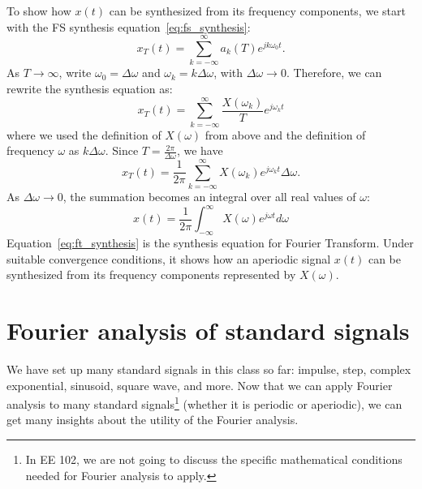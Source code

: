 To show how $x(t)$ can be synthesized from its frequency components, we start with the FS synthesis equation~\eqref{eq:fs_synthesis}:
\[ 
  x_T(t) = \sum_{k=-\infty}^{\infty} a_k(T)e^{jk\omega_0 t}.
\]
As $T \to \infty$, write $\omega_0=\Delta\omega$ and $\omega_k=k\Delta\omega$, with $\Delta\omega\to0$. Therefore, we can rewrite the synthesis equation as:
\begin{equation*}
  x_T(t) = \sum_{k=-\infty}^{\infty} \frac{X(\omega_k)}{T} e^{j\omega_k t}
\end{equation*}
where we used the definition of $X(\omega)$ from above and the definition of frequency $\omega$ as $k \Delta \omega$. Since $T = \frac{2\pi}{\Delta \omega}$, we have
\[
  x_T(t) = \frac{1}{2\pi}\sum_{k=-\infty}^{\infty}  X(\omega_k) e^{j\omega_k t} \Delta \omega.
\]
As $\Delta \omega \to 0$, the summation becomes an integral over all real values of $\omega$:
\begin{equation}
  \label{eq:ft_synthesis}
  x(t) = \frac{1}{2\pi} \int_{-\infty}^{\infty} X(\omega) e^{j\omega t} d\omega
\end{equation}
Equation~\eqref{eq:ft_synthesis} is the synthesis equation for Fourier Transform. Under suitable convergence conditions, it shows how an aperiodic signal $x(t)$ can be synthesized from its frequency components represented by $X(\omega)$.
\section{Fourier analysis of standard signals}
We have set up many standard signals in this class so far:  impulse, step, complex exponential, sinusoid, square wave, and more. Now that we can apply Fourier analysis to many standard signals\footnote{In EE 102, we are not going to discuss the specific mathematical conditions needed for Fourier analysis to apply.} (whether it is periodic or aperiodic), we can get many insights about the utility of the Fourier analysis. 

